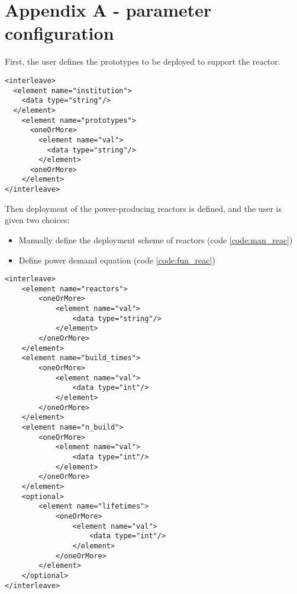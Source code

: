 \documentclass[12pt,letterpaper]{article}
\newenvironment{code}{\captionsetup{type=listing}}{}
\begin{document}
\begin{comment}
\end{enumerate}



\section{Advanced Fuel Cycles}
\end{comment}

\section{Appendix A - parameter configuration}

First, the user defines the prototypes to be deployed
to support the reactor.

\begin{code}

\begin{verbatim}
<interleave>
  <element name="institution">
    <data type="string"/>
  </element>
    <element name="prototypes">
      <oneOrMore>
        <element name="val">
          <data type="string"/>
        </element>
      <oneOrMore>
    </element>
</interleave>

\end{verbatim}
\label{code:pro}
\end{code}


Then deployment of the power-producing reactors is defined, and the user
is given two choices:
\begin{itemize}
  \item Manually define the deployment scheme of reactors (code \ref{code:man_reac})
  \item Define power demand equation (code \ref{code:fun_reac})
\end{itemize}

\begin{code}
\begin{verbatim}
<interleave>
    <element name="reactors">
        <oneOrMore>
            <element name="val">
                <data type="string"/>
            </element>
        </oneOrMore>
    </element>
    <element name="build_times">
        <oneOrMore>
            <element name="val">
                <data type="int"/>
            </element>
        </oneOrMore>
    </element>
    <element name="n_build">
        <oneOrMore>
            <element name="val">
                <data type="int"/>
            </element>
        </oneOrMore>
    </element>
    <optional>
        <element name="lifetimes">
            <oneOrMore>
                <element name="val">
                    <data type="int"/>
                </element>
            </oneOrMore>
        </element>
    </optional>
</interleave>
\end{verbatim}
\label{code:man_reac}
\end{code}
\end{document}
